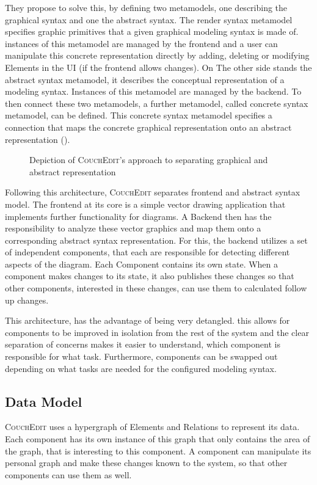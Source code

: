 They propose to solve this, by defining two metamodels, one describing the graphical syntax and one the abstract syntax. The render syntax metamodel specifies graphic primitives that a given graphical modeling syntax is made of. instances of this metamodel are managed by the frontend and a user can manipulate this concrete representation directly by adding, deleting or modifying Elements in the UI (if the frontend allows changes). On The other side stands the abstract syntax metamodel, it describes the conceptual representation of a modeling syntax. Instances of this metamodel are managed by the backend. To then connect these two metamodels, a further metamodel, called concrete syntax metamodel, can be defined. This concrete syntax metamodel specifies a connection that maps the concrete graphical representation onto an abstract representation (). 

\begin{figure}
  \centering
  
  \caption{Depiction of \textsc{CouchEdit}'s approach to separating graphical and abstract representation}
  \label{fig:transmm}
  \end{figure}

Following this architecture, \textsc{CouchEdit} separates frontend and abstract syntax model. The frontend at its core is a simple vector drawing application that implements further functionality for diagrams. A Backend then has the responsibility to analyze these vector graphics and map them onto a corresponding abstract syntax representation. For this, the backend utilizes a set of independent components, that each are responsible for detecting different aspects of the diagram. Each Component contains its own state. When a component makes changes to its state, it also publishes these changes so that other components, interested in these changes, can use them to calculated follow up changes.  

This architecture, has the advantage of being very detangled. this allows for components to be improved in isolation from the rest of the system and the clear separation of concerns makes it easier to understand, which component is responsible for what task. Furthermore, components can be swapped out depending on what tasks are needed for the configured modeling syntax.



\subsection{Data Model}
\textsc{CouchEdit} uses a hypergraph of Elements and Relations to represent its data. Each component has its own instance of this graph that only contains the area of the graph, that is interesting to this component. A component can manipulate its personal graph and make these changes known to the system, so that other components can use them as well.


